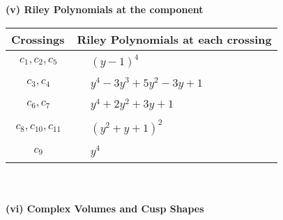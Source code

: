 \documentclass[1p]{elsarticle_modified}
\theoremstyle{definition}
\begin{document}
\newpage\renewcommand{\arraystretch}{1}
\flushleft \textbf{(v) Riley Polynomials at the component}\newline \\
\begin{tabular}{m{50pt}|m{274pt}}
Crossings & \hspace{64pt}Riley Polynomials at each crossing \\
\hline $$\begin{aligned}c_{1},c_{2},c_{5}\end{aligned}$$&$\begin{aligned}
&(y-1)^4
\end{aligned}$\\
\hline $$\begin{aligned}c_{3},c_{4}\end{aligned}$$&$\begin{aligned}
&y^4-3 y^3+5 y^2-3 y+1
\end{aligned}$\\
\hline $$\begin{aligned}c_{6},c_{7}\end{aligned}$$&$\begin{aligned}
&y^4+2 y^2+3 y+1
\end{aligned}$\\
\hline $$\begin{aligned}c_{8},c_{10},c_{11}\end{aligned}$$&$\begin{aligned}
&(y^2+y+1)^2
\end{aligned}$\\
\hline $$\begin{aligned}c_{9}\end{aligned}$$&$\begin{aligned}
&y^4
\end{aligned}$\\
\hline
\end{tabular}\\~\\
\newpage\flushleft \textbf{(vi) Complex Volumes and Cusp Shapes}
\end{document}
